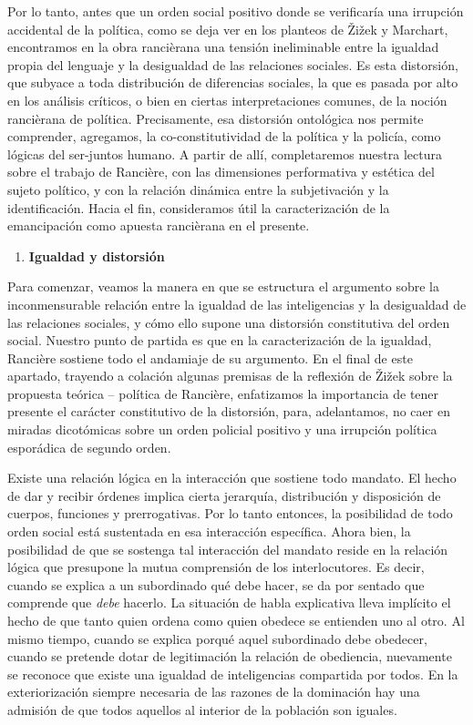 \documentclass{book}
\begin{document}
Por lo tanto, antes que un orden social positivo donde se verificaría
una irrupción accidental de la política, como se deja ver en los
planteos de Žižek y Marchart, encontramos en la obra rancièrana una
tensión ineliminable entre la igualdad propia del lenguaje y la
desigualdad de las relaciones sociales. Es esta distorsión, que subyace
a toda distribución de diferencias sociales, la que es pasada por alto
en los análisis críticos, o bien en ciertas interpretaciones comunes, de
la noción rancièrana de política. Precisamente, esa distorsión
ontológica nos permite comprender, agregamos, la co-constitutividad de
la política y la policía, como lógicas del ser-juntos humano. A partir
de allí, completaremos nuestra lectura sobre el trabajo de Rancière, con
las dimensiones performativa y estética del sujeto político, y con la
relación dinámica entre la subjetivación y la identificación. Hacia el
fin, consideramos útil la caracterización de la emancipación como
apuesta rancièrana en el presente.

\begin{enumerate}
\def\labelenumi{\arabic{enumi}.}
\setcounter{enumi}{1}
\item
  \textbf{Igualdad y distorsión}
\end{enumerate}

Para comenzar, veamos la manera en que se estructura el argumento sobre
la inconmensurable relación entre la igualdad de las inteligencias y la
desigualdad de las relaciones sociales, y cómo ello supone una
distorsión constitutiva del orden social. Nuestro punto de partida es
que en la caracterización de la igualdad, Rancière sostiene todo el
andamiaje de su argumento. En el final de este apartado, trayendo a
colación algunas premisas de la reflexión de Žižek sobre la propuesta
teórica -- política de Rancière, enfatizamos la importancia de tener
presente el carácter constitutivo de la distorsión, para, adelantamos,
no caer en miradas dicotómicas sobre un orden policial positivo y una
irrupción política esporádica de segundo orden.

Existe una relación lógica en la interacción que sostiene todo mandato.
El hecho de dar y recibir órdenes implica cierta jerarquía, distribución
y disposición de cuerpos, funciones y prerrogativas. Por lo tanto
entonces, la posibilidad de todo orden social está sustentada en esa
interacción específica. Ahora bien, la posibilidad de que se sostenga
tal interacción del mandato reside en la relación lógica que presupone
la mutua comprensión de los interlocutores. Es decir, cuando se explica
a un subordinado qué debe hacer, se da por sentado que comprende que
\emph{debe} hacerlo. La situación de habla explicativa lleva implícito
el hecho de que tanto quien ordena como quien obedece se entienden uno
al otro. Al mismo tiempo, cuando se explica porqué aquel subordinado
debe obedecer, cuando se pretende dotar de legitimación la relación de
obediencia, nuevamente se reconoce que existe una igualdad de
inteligencias compartida por todos. En la exteriorización siempre
necesaria de las razones de la dominación hay una admisión de que todos
aquellos al interior de la población son iguales.
\end{document}
